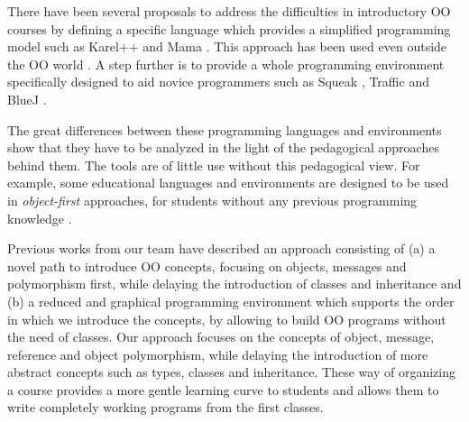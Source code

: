 \medskip 



There have been several proposals to address the difficulties in introductory OO courses 
by defining a specific language which provides a simplified programming model such as Karel++ \cite{bergin_karel++:_1996} and Mama \cite{harrisonmama}.
This approach has been used even outside the OO world \cite{feurzeig_programming-languages_1970, pattis_karel_1981, lopez_nombre_2012}.
A step further is to provide a whole programming environment specifically designed to aid novice programmers 
such as Squeak \cite{ingalls_back_1997}, Traffic \cite{broy_outside-method_2003} and BlueJ \cite{bennedsen_bluej_2010}. 

The great differences between these programming languages and environments show that they have to be analyzed in the light of the pedagogical approaches behind them.
The tools are of little use without this pedagogical view.
For example, some educational languages and environments are designed to be used in \textit{object-first} approaches, 
\ie for students without any previous programming knowledge \cite{arnow_introduction_1998, bruce_library_2001}.

\medskip
Previous works from our team \cite{lombardi_instances_2007,lombardi_carlos_alumnos_2008,griggio_programming_2011,spigariol_lucas_ensenando_2013} have described an approach consisting of
(a) a novel path to introduce OO concepts, focusing on objects, messages and polymorphism first, while delaying the introduction of classes and inheritance and 
(b) a reduced and graphical programming environment which supports the order in which we introduce the concepts, by allowing to build OO programs without the need of classes.
Our approach focuses on the concepts of object, message, reference and object polymorphism, while delaying the introduction of more abstract concepts such as types, classes and inheritance.
These way of organizing a course provides a more gentle learning curve to students and allows them to write completely working programs from the first classes.

